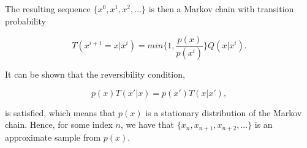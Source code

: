 The resulting sequence $\{  x^0, x^1, x^2,... \}$ is then a Markov chain with transition probability

\begin{equation}
    T(x^{i+1} = x|x^i) = min \Big \{ 1, \frac{p(x)}{p(x^i)} \Big \} Q(x|x^i).
\end{equation}

It can be shown that the reversibility condition, 

\begin{equation}
    p(x)T(x'|x) = p(x')T(x|x'),
\end{equation} 

is satisfied, which means that $p(x)$ is a stationary distribution of the Markov chain. Hence, for some index $n$, we have that $\{x_n, x_{n+1}, x_{n+2},...\}$ is an approximate sample from $p(x)$.








